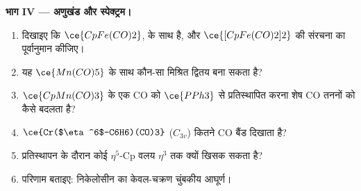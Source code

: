 \begin{problem}
\medskip\noindent\textbf{भाग IV --- अणुखंड और स्पेक्ट्रम।}
\begin{enumerate}[resume]
  \item दिखाइए कि $\ce{CpFe(CO)2}$,  के साथ  है, और
        $\ce{[CpFe(CO)2]2}$ की संरचना का पूर्वानुमान कीजिए।
  \item यह $\ce{Mn(CO)5}$ के साथ कौन-सा मिश्रित द्वितय बना सकता है?
  \item $\ce{CpMn(CO)3}$ के एक CO को $\ce{PPh3}$ से प्रतिस्थापित करना शेष CO
        तननों को कैसे बदलता है?
  \item $\ce{Cr($\eta^6$-C6H6)(CO)3}$ ($C_{3v}$) कितने CO बैंड दिखाता है?
  \item प्रतिस्थापन के दौरान कोई $\eta^5$-Cp वलय $\eta^3$ तक क्यों खिसक सकता है?
  \item परिणाम बताइए: निकेलोसीन का केवल-चक्रण चुंबकीय आघूर्ण।
\end{enumerate}
\end{problem}
